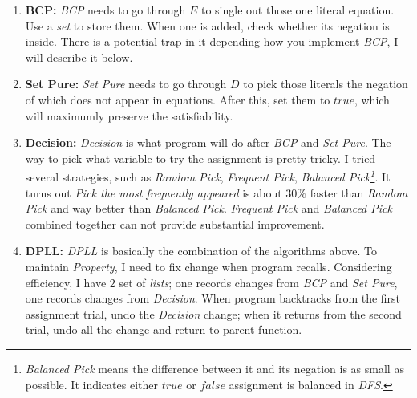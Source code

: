 \documentclass[a4paper,10pt]{article}
\begin{document}
\begin{enumerate}
\item \textbf{BCP:} \textit{BCP} needs to go through $E$ to single out those one literal
    equation. Use a \textit{set} to store them. When one is added, check whether 
    its negation is inside. There is a potential trap in it depending how you implement 
    \textit{BCP}, I will describe it below.
\item \textbf{Set Pure:} \textit{Set Pure} needs to go through $D$ to pick those literals
    the negation of which does not appear in equations. After this, set them to $true$,
    which will maximumly preserve the satisfiability.
\item \textbf{Decision:} \textit{Decision} is what program will do after
    \textit{BCP} and \textit{Set Pure}. The way to pick what variable to try the assignment
    is pretty tricky. I tried several strategies,
    such as \textit{Random Pick}, \textit{Frequent
    Pick}, \textit{Balanced Pick\footnote{\textit{Balanced Pick} means
    the difference between it and its negation is as small as possible. It indicates either
    $true$ or $false$ assignment is balanced in \textit{DFS}.}}. It turns out
    \textit{Pick the most frequently appeared} is about $30\%$ faster than \textit{Random
    Pick} and way better than \textit{Balanced Pick}. 
    \textit{Frequent Pick} and \textit{Balanced Pick} combined together
    can not provide substantial improvement. 
\item \textbf{DPLL:} \textit{DPLL} is basically the combination of the algorithms above. 
    To maintain \textit{Property}, I need to fix change when program recalls.
    Considering
    efficiency, I have $2$ set of \textit{lists}; one records changes from \textit{BCP} and
    \textit{Set Pure}, one records changes from \textit{Decision}. When program backtracks
    from the first assignment trial,
    undo the \textit{Decision} change; when it returns from 
    the second trial, undo all the change and return to parent function.
\end{enumerate}
\end{document}
